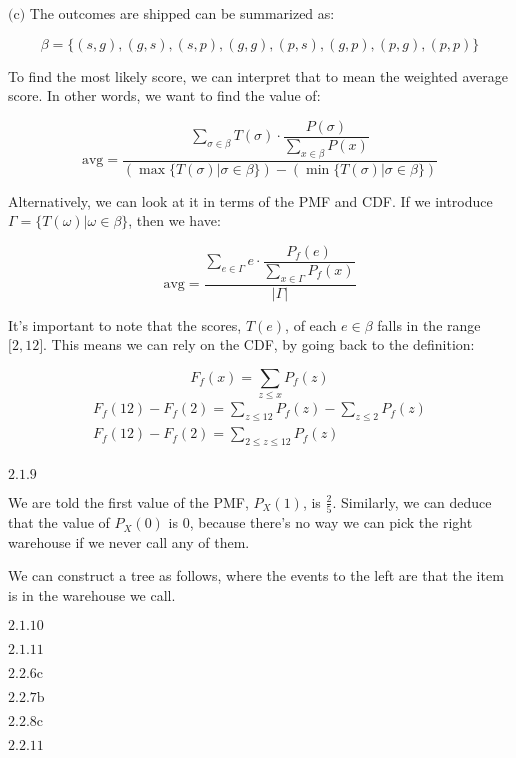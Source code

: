 \documentclass{article}
\newcommand{\problem}[2]{$\boxed{\text{#1.#2}}$}
\newcommand{\subproblem}[3]{$\boxed{\text{(#3)}}$}
\begin{document}
%
\subproblem{2.1}{7}{c} The outcomes are shipped can be summarized as:

\[
\beta=\{(s,g),(g,s),(s,p),(g,g),(p,s),(g,p),(p,g),(p,p)\}
\]

To find the most likely score, we can interpret that to mean the
weighted average score. In other words, we want to find the value of:

\[
\text{avg}=
\dfrac
    {\sum\limits_{\sigma\in\beta}T(\sigma)\cdot \dfrac{P(\sigma)}{\sum\limits_{x\in\beta}P(x)} }
    {(\max\{T(\sigma)|\sigma\in\beta\})-(\min\{T(\sigma)|\sigma\in\beta\})}
\]

Alternatively, we can look at it in terms of the PMF and CDF. If we
introduce $\Gamma=\{T(\omega)|\omega\in\beta\}$, then we have:

\[
\text{avg}=
\dfrac
    {\sum\limits_{e\in\Gamma}e\cdot \dfrac{P_f(e)}{\sum\limits_{x\in\Gamma}P_f(x)}}
    {|\Gamma|}
\]

It's important to note that the scores, $T(e)$, of each $e\in\beta$
falls in the range $\lbrack{}2,12\rbrack$. This means we can rely on
the CDF, by going back to the definition:



\[
F_f(x)=\sum\limits_{z\le x}P_f(z)
\] \[
\begin{array}{l}
F_f(12)-F_f(2)=\sum\limits_{z\le 12}P_f(z)-\sum\limits_{z\le 2}P_f(z) \\
F_f(12)-F_f(2)=\sum\limits_{2\le z\le 12}P_f(z) \\
\end{array}
\]

%
\problem{2.1}{9}

We are told the first value of the PMF, $P_X(1)$, is
$\frac{2}{5}$. Similarly, we can deduce that the value of $P_X(0)$ is
$0$, because there's no way we can pick the right warehouse if we
never call any of them.

We can construct a tree as follows, where the events to the left are
that the item is in the warehouse we call.


%
\problem{2.1}{10}

%
\problem{2.1}{11}

%
\problem{2.2}{6c}

%
\problem{2.2}{7b}

%
\problem{2.2}{8c}

%
\problem{2.2}{11}
\end{document}
